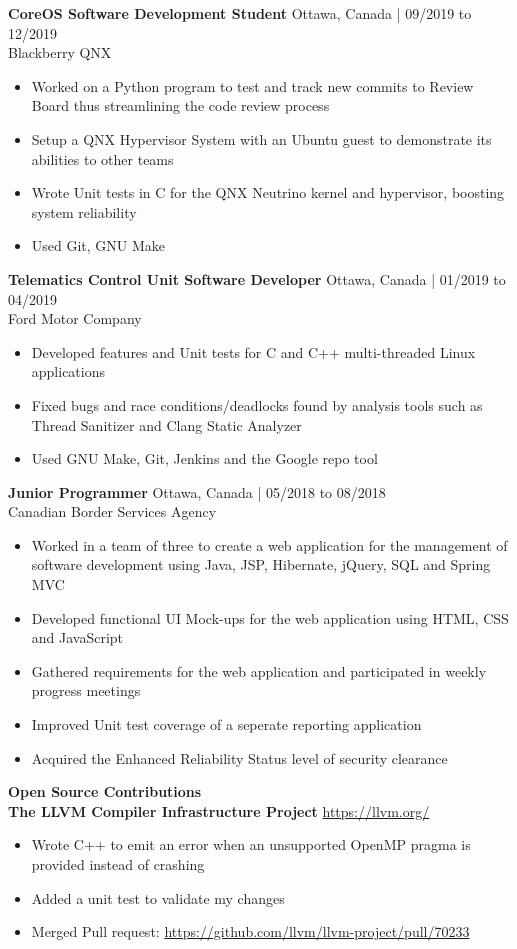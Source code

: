 \documentclass[10pt]{article}
\begin{document}
\textbf{CoreOS Software Development Student} \hfill Ottawa, Canada | 09/2019 to 12/2019 \\
Blackberry QNX
\begin{itemize}
    \item Worked on a Python program to test and track new commits to Review Board thus streamlining the code review process
    \item Setup a QNX Hypervisor System with an Ubuntu guest to demonstrate its abilities to other teams
    \item Wrote Unit tests in C for the QNX Neutrino kernel and hypervisor, boosting system reliability
    \item Used Git, GNU Make
\end{itemize}

\textbf{Telematics Control Unit Software Developer} \hfill Ottawa, Canada | 01/2019 to 04/2019 \\
Ford Motor Company
\begin{itemize}[noitemsep]
    \item Developed features and Unit tests for C and C++ multi-threaded Linux applications
    \item Fixed bugs and race conditions/deadlocks found by analysis tools such as Thread Sanitizer and Clang Static Analyzer
    \item Used GNU Make, Git, Jenkins and the Google repo tool
\end{itemize}

\textbf{Junior Programmer} \hfill Ottawa, Canada | 05/2018 to 08/2018 \\
Canadian Border Services Agency
\begin{itemize}
    \item Worked in a team of three to create a web application for the management of software development using Java, JSP, Hibernate, jQuery, SQL and Spring MVC
    \item Developed functional UI Mock-ups for the web application using HTML, CSS and JavaScript
    \item Gathered requirements for the web application and participated in weekly progress meetings
    \item Improved Unit test coverage of a seperate reporting application
    \item Acquired the Enhanced Reliability Status level of security clearance
\end{itemize}

{\Large\textbf{Open Source Contributions}}\space \hrulefill
\\
\textbf{The LLVM Compiler Infrastructure Project} \hfill \url{https://llvm.org/}
\begin{itemize}[noitemsep]
    \item Wrote C++ to emit an error when an unsupported OpenMP pragma is provided instead of crashing 
    \item Added a unit test to validate my changes
    \item Merged Pull request: \url{https://github.com/llvm/llvm-project/pull/70233}
\end{itemize} 
\end{document}
